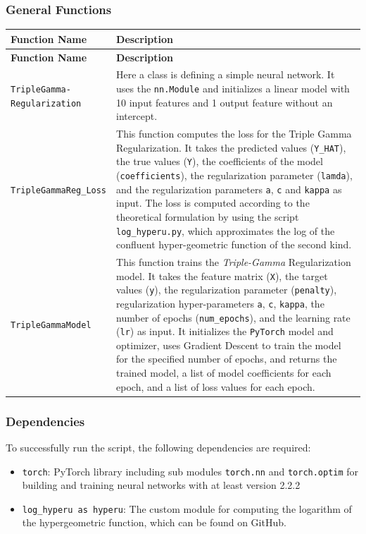\documentclass[12pt,a4paper]{article}
\begin{document}
\subsubsection*{General Functions}

\begin{longtable}{|p{4cm}|p{9cm}|}
\hline
\textbf{Function Name} & \textbf{Description} \\
\hline
\endfirsthead

\hline
\textbf{Function Name} & \textbf{Description} \\
\hline
\endhead

\hline
\endfoot

\hline
\endlastfoot

\makecell{\texttt{TripleGamma-}\\\texttt{Regularization}} & Here a class is defining a simple neural network. It uses the \texttt{nn.Module} and initializes a linear model with 10 input features and 1 output feature without an intercept. \\
\hline
	\texttt{TripleGammaReg\_Loss} & This function computes the loss for the Triple Gamma Regularization. It takes the predicted values (\texttt{Y\_HAT}), the true values (\texttt{Y}), the coefficients of the model (\texttt{coefficients}), the regularization parameter (\texttt{lamda}), and the regularization parameters \texttt{a}, \texttt{c} and \texttt{kappa} as input. The loss is computed according to the theoretical formulation by using the script \texttt{log\_hyperu.py}, which approximates the log of the confluent hyper-geometric function of the second kind. \\
\hline
\texttt{TripleGammaModel} & This function trains the \textit{Triple-Gamma} Regularization model. It takes the feature matrix (\texttt{X}), the target values (\texttt{y}), the regularization parameter (\texttt{penalty}), regularization hyper-parameters \texttt{a}, \texttt{c}, \texttt{kappa}, the number of epochs (\texttt{num\_epochs}), and the learning rate (\texttt{lr}) as input. It initializes the \texttt{PyTorch} model and optimizer, uses Gradient Descent to train the model for the specified number of epochs, and returns the trained model, a list of model coefficients for each epoch, and a list of loss values for each epoch.\\
\hline
\end{longtable}

\subsubsection*{Dependencies}
To successfully run the script, the following dependencies are required:
\begin{itemize}
    \item \texttt{torch}: PyTorch library including sub modules \texttt{torch.nn} and \texttt{torch.optim} for building and training neural networks with at least version 2.2.2
    \item \texttt{log\_hyperu as hyperu}: The custom module for computing the logarithm of the hypergeometric function, which can be found on GitHub.
\end{itemize}
\end{document}
